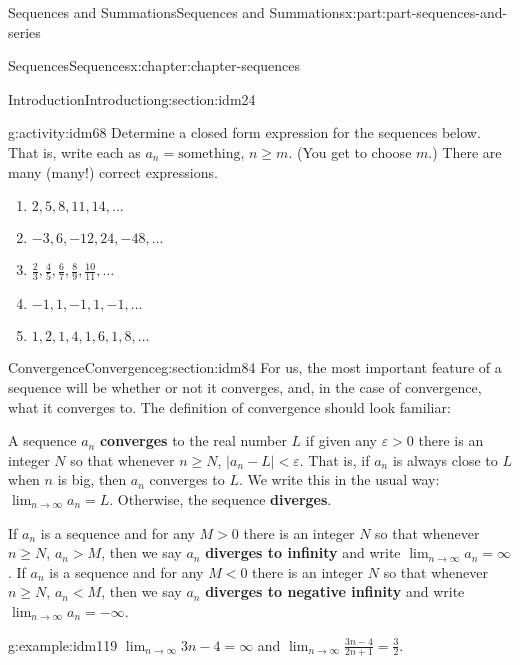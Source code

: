 \documentclass[oneside,10pt,]{book}
\newcommand{\terminology}[1]{\textbf{#1}}
\numberwithin{equation}{section}
\begin{document}
\begin{partptx}{Sequences and Summations}{}{Sequences and Summations}{}{}{x:part:part-sequences-and-series}
\begin{chapterptx}{Sequences}{}{Sequences}{}{}{x:chapter:chapter-sequences}
\begin{sectionptx}{Introduction}{}{Introduction}{}{}{g:section:idm24}
\begin{activity}{}{g:activity:idm68}%
Determine a closed form expression for the sequences below. That is, write each as \(a_n = \textrm{something}\), \(n \geq m\). (You get to choose \(m\).) There are many (many!) correct expressions.%
\begin{enumerate}[font=\bfseries,label=(\alph*),ref=\alph*]
\item{}\(2, 5, 8, 11, 14, \dots\)\item{}\(-3, 6, -12, 24, -48, \dots\)\item{}\(\frac{2}{3}, \frac{4}{5}, \frac{6}{7}, \frac{8}{9}, \frac{10}{11}, \dots\)\item{}\(-1, 1, -1, 1, -1, \dots\)\item{}\(1, 2, 1, 4, 1, 6, 1, 8, \dots\)\end{enumerate}
\end{activity}
\end{sectionptx}
%
%
\typeout{************************************************}
\typeout{************************************************}
%
\begin{sectionptx}{Convergence}{}{Convergence}{}{}{g:section:idm84}
For us, the most important feature of a sequence will be whether or not it converges, and, in the case of convergence, what it converges to. The definition of convergence should look familiar:%
\par
A sequence \(a_n\) \terminology{converges} to the real number \(L\) if given any \(\varepsilon > 0\) there is an integer \(N\) so that whenever \(n \geq N\), \(|a_n - L| < \varepsilon\). That is, if \(a_n\) is always close to \(L\) when \(n\) is big, then \(a_n\) converges to \(L\). We write this in the usual way: \(\displaystyle\lim_{n \to \infty}a_n = L\). Otherwise, the sequence \terminology{diverges}.%
\par
If \(a_n\) is a sequence and for any \(M > 0\) there is an integer \(N\) so that whenever \(n \geq N\), \(a_n > M\), then we say \(a_n\) \terminology{diverges to infinity} and write \(\displaystyle\lim_{n \to \infty}a_n = \infty\). If \(a_n\) is a sequence and for any \(M < 0\) there is an integer \(N\) so that whenever \(n \geq N\), \(a_n < M\), then we say \(a_n\) \terminology{diverges to negative infinity} and write \(\displaystyle\lim_{n \to \infty}a_n = -\infty\).%
\begin{example}{}{g:example:idm119}%
\(\displaystyle\lim_{n \to \infty} 3n-4 = \infty\) and \(\displaystyle\lim_{n \to \infty} \frac{3n-4}{2n+1} = \frac{3}{2}\).\end{example}

\end{sectionptx}
\end{chapterptx}
\end{partptx}
\end{document}

